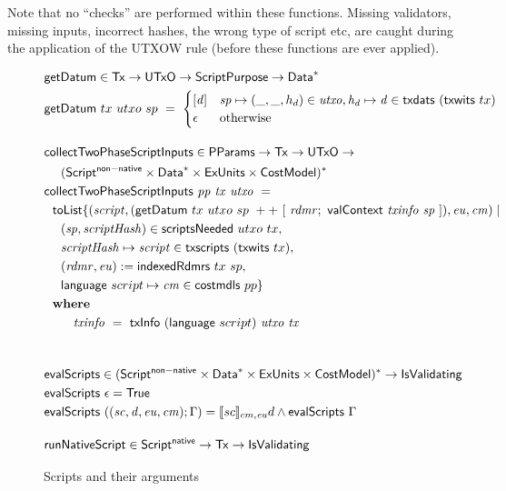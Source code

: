 Note that no ``checks'' are performed within these functions.
Missing validators, missing inputs, incorrect hashes, the wrong type of script etc,
are caught during the application of the UTXOW rule (before these functions are ever applied).

\begin{figure}[htb]
  \begin{align*}
    & \fun{getDatum} \in \Tx \to \UTxO \to \ScriptPurpose \to \seqof{\Data} \\
    & \fun{getDatum}~{tx}~{utxo}~{sp}~=~
      \begin{cases}
        [\var{d}] & \var{sp} \mapsto (\_, \_, h_d) \in \var{utxo}, \var{h_d}\mapsto \var{d} \in \fun{txdats}~(\fun{txwits}~tx) \\
        \epsilon  & \text{otherwise}
      \end{cases}
    \nextdef
    & \fun{collectTwoPhaseScriptInputs} \in \PParams \to \Tx \to \UTxO \to \\
    & ~~~~ \seqof{(\ScriptNonNative \times \seqof{\Data} \times \ExUnits \times \CostMod)} \\
    & \fun{collectTwoPhaseScriptInputs} ~\var{pp}~\var{tx}~ \var{utxo} ~=~ \\
    & ~~\fun{toList} \{ (\var{script}, (\fun{getDatum}~tx~utxo~sp~++~[~\var{rdmr};~\fun{valContext}~\var{txinfo}~\var{sp}~]), \var{eu}, \var{cm}) \mid \\
    & ~~~~(\var{sp}, \var{scriptHash}) \in \fun{scriptsNeeded}~{utxo}~{tx}, \\
    & ~~~~\var{scriptHash}\mapsto \var{script}\in \fun{txscripts}~(\fun{txwits}~tx), \\
    & ~~~~(\var{rdmr}, \var{eu}) := \fun{indexedRdmrs}~tx~sp, \\
    & ~~~~\fun{language}~{script} \mapsto \var{cm} \in \fun{costmdls}~{pp} \} \\
    & \where \\
    & ~~~~~~~ \var{txinfo}~=~\fun{txInfo}~(\fun{language}~{script})~\var{utxo}~\var{tx} \\
    \nextdef
    & \fun{evalScripts} \in \seqof{(\ScriptNonNative \times \seqof{\Data} \times \ExUnits \times \CostMod)} \to \IsValidating \\
    & \fun{evalScripts}~\epsilon = \True \\
    & \fun{evalScripts}~((\var{sc}, \var{d}, \var{eu}, \var{cm});\Gamma) =
      \llbracket sc \rrbracket_{cm,\var{eu}} d \land \fun{evalScripts}~\Gamma
    \nextdef
    &\fun{runNativeScript} \in\ScriptNative \to \Tx \to \IsValidating
  \end{align*}
  \caption{Scripts and their arguments}
  \label{fig:functions:script2}
\end{figure}

